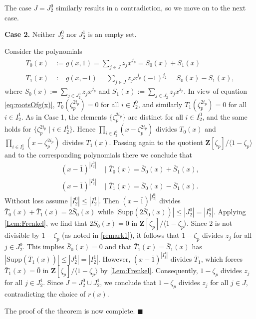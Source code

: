 \documentclass[10pt,a4paper]{amsart}
\newenvironment{proofofA}{{\bf {Proof of Theorem \ref{Thm:A}.} }}{\hfill $\blacksquare$ \\}
\def\Z{\mathbf{Z}}
\def\Supp{\mathrm{Supp}}
\begin{document}
\begin{proofofA}
The case $J = J_2^0$ similarly results in a contradiction, so we move on to the next case.

{\bf Case 2. }
Neither $J_2^0$ nor $J_2^1$ is an empty set.

Consider the polynomials 
\begin{align}
T_0(x)&:=g(x,1)= \sum_{j \in J}  z_j x^{j_p}= S_0(x) +S_1(x)\\
T_1(x)&:=g(x,-1)= \sum_{j \in J}  z_j x^{j_p} (-1)^{j_2}=S_0(x) - S_1(x), 
\end{align}
where $S_0(x):= \sum_{j \in J_2^0}  z_j x^{j_p}$ and $S_1(x):= \sum_{j \in J_2^1}  z_j x^{j_p}$. 
In view of equation \eqref{eq:rootsOfg(x)},  
$T_0(\zeta_p^{2i_p}) = 0$ for all $i \in I_2^0$, 
and similarly $T_1(\zeta_p^{2i_p})= 0$ for all $i \in I_2^1$. As in Case 1, the elements $\{\zeta_p^{2i_p}\} $ are distinct for all $i \in I_2^0$,
and the same holds for $\{ \zeta_p^{2i_p} \mid i \in I_2^1\}$.    Hence $\prod_{i \in I_2^0}(x- \zeta_p^{2i_p})$ divides  $T_0(x)$ and $\prod_{i \in I_2^1}(x- \zeta_p^{2i_p})$ divides  $T_1(x)$.  Passing again to the quotient  $\Z[\zeta_p]/\langle 1 - \zeta_p \rangle $ and to the corresponding polynomials there  we conclude that 
\begin{align}
(x-\bar{1})^{|I_2^0|}\, \,  & \big| \, \,   \bar{T}_0(x) =  \bar{S}_0(x) + \bar{S}_1(x), \\ 
(x-\bar{1})^{|I_2^1|}\, \,  & \big| \, \,   \bar{T}_1(x) =  \bar{S}_0(x) - \bar{S}_1(x).
\end{align}
Without loss assume $|I_2^0 | \leq |I_2^1|$. Then 
$(x-\bar{1})^{|I_2^0|}$ divides $\bar{T}_0(x) +\bar{T}_1(x)= 2 \bar{S}_0(x)$ while $|\Supp(2\bar{S}_0(x))|  \leq |J_2^0|= |I_2^0|$. 
Applying \autoref{Lem:Frenkel}, we find that $2 \bar{S}_0(x) = \bar{0}$ in $\Z[\zeta_p]/\langle 1 - \zeta_p \rangle$. Since $2$ is not divisible by $1 - \zeta_p$ (as noted in \autoref{remark1}), it follows that $1 - \zeta_p$ divides $z_j$ for all $j \in J_2^0$. This implies $\bar{S}_0(x) = 0$ and that $\bar{T}_1(x) = \bar{S}_1(x)$ has $|\Supp(\bar{T}_1(x))| \leq |J_2^1| = |I_2^1|$. However, $(x - \bar{1})^{|I_j^1|}$ divides $\bar{T}_1$, which forces $\bar{T}_1(x) = \bar{0}$ in $\Z[\zeta_p]/\langle 1 - \zeta_p \rangle$ by \autoref{Lem:Frenkel}. Consequently, $1 - \zeta_p$ divides $z_j$ for all $j \in J_2^1$. Since $J = J_2^0 \cup J_2^1$, we conclude that $1 - \zeta_p$ divides $z_j$ for all $j \in J$, contradicting the choice of $r(x)$. 

The proof of the theorem is now complete.
\end{proofofA}
\end{document}
